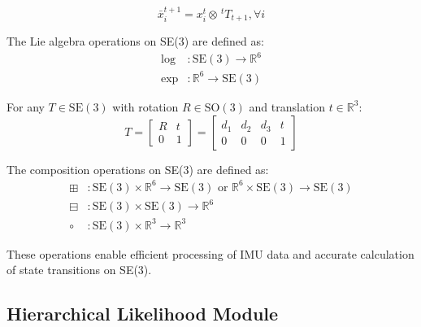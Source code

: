 \documentclass[a4paper,fleqn,10pt,twocolumn]{SICE_ISCS}
\begin{document}
\begin{equation}
\bar{x}_i^{t+1} = x_i^t \otimes \, ^t T_{t+1}, \forall i
\end{equation}

The Lie algebra operations on SE(3) are defined as:
\begin{align}
\log &: \mathrm{SE}(3) \rightarrow \mathbb{R}^6 \\
\exp &: \mathbb{R}^6 \rightarrow \mathrm{SE}(3)
\end{align}

For any $T \in \mathrm{SE}(3)$ with rotation $R \in \mathrm{SO}(3)$ and translation $t \in \mathbb{R}^3$:
\begin{equation}
T = \begin{bmatrix} R & t \\ 0 & 1 \end{bmatrix} = \begin{bmatrix} d_1 & d_2 & d_3 & t \\ 0 & 0 & 0 & 1 \end{bmatrix}
\end{equation}

The composition operations on SE(3) are defined as:
\begin{align}
\boxplus &: \mathrm{SE}(3) \times \mathbb{R}^6 \rightarrow \mathrm{SE}(3) \text{ or } \mathbb{R}^6 \times \mathrm{SE}(3) \rightarrow \mathrm{SE}(3) \\
\boxminus &: \mathrm{SE}(3) \times \mathrm{SE}(3) \rightarrow \mathbb{R}^6 \\
\circ &: \mathrm{SE}(3) \times \mathbb{R}^3 \rightarrow \mathbb{R}^3
\end{align}

These operations enable efficient processing of IMU data and accurate calculation of state transitions on SE(3).

\subsection{Hierarchical Likelihood Module}
\end{document}
